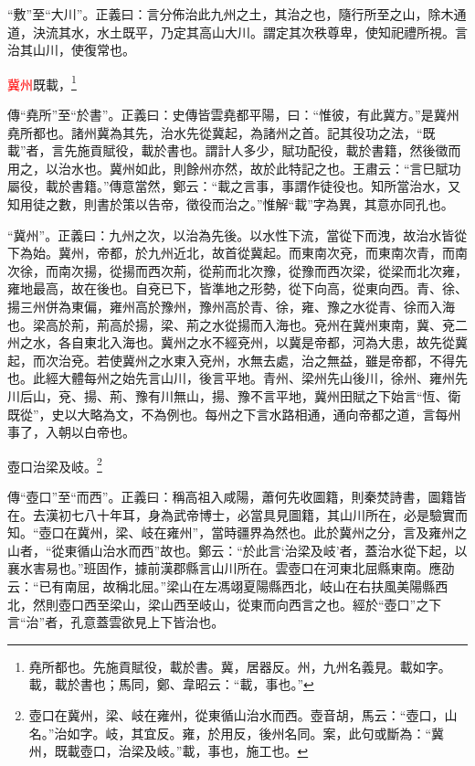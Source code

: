 {\noindent\shu{}\fzkt “敷”至“大川”。正義曰：言分佈治此九州之土，其治之也，隨行所至之山，除木通道，決流其水，水土既平，乃定其高山大川。謂定其次秩尊卑，使知祀禮所視。言治其山川，使復常也。 \par}

\textcolor{red}{冀州}既載，\footnote{堯所都也。先施貢賦役，載於書。冀，居器反。州，九州名義見。載如字。載，載於書也；馬同，鄭、韋昭云：“載，事也。”}

{\noindent\zhuan{}\fzbyks 傳“堯所”至“於書”。正義曰：史傳皆雲堯都平陽，曰：“惟彼，有此冀方。”是冀州堯所都也。諸州冀為其先，治水先從冀起，為諸州之首。記其役功之法，“既載”者，言先施貢賦役，載於書也。謂計人多少，賦功配役，載於書籍，然後徵而用之，以治水也。冀州如此，則餘州亦然，故於此特記之也。王肅云：“言巳賦功屬役，載於書籍。”傳意當然，鄭云：“載之言事，事謂作徒役也。知所當治水，又知用徒之數，則書於策以告帝，徵役而治之。”惟解“載”字為異，其意亦同孔也。 \par}

{\noindent\shu{}\fzkt “冀州”。正義曰：九州之次，以治為先後。以水性下流，當從下而洩，故治水皆從下為始。冀州，帝都，於九州近北，故首從冀起。而東南次兗，而東南次青，而南次徐，而南次揚，從揚而西次荊，從荊而北次豫，從豫而西次梁，從梁而北次雍，雍地最高，故在後也。自兗已下，皆準地之形勢，從下向高，從東向西。青、徐、揚三州併為東偏，雍州高於豫州，豫州高於青、徐，雍、豫之水從青、徐而入海也。梁高於荊，荊高於揚，梁、荊之水從揚而入海也。兗州在冀州東南，冀、兗二州之水，各自東北入海也。冀州之水不經兗州，以冀是帝都，河為大患，故先從冀起，而次治兗。若使冀州之水東入兗州，水無去處，治之無益，雖是帝都，不得先也。此經大體每州之始先言山川，後言平地。青州、梁州先山後川，徐州、雍州先川后山，兗、揚、荊、豫有川無山，揚、豫不言平地，冀州田賦之下始言“恆、衛既從”，史以大略為文，不為例也。每州之下言水路相通，通向帝都之道，言每州事了，入朝以白帝也。 \par}

壺口治梁及岐。\footnote{壺口在冀州，梁、岐在雍州，從東循山治水而西。壺音胡，馬云：“壺口，山名。”治如字。岐，其宜反。雍，於用反，後州名同。案，此句或斷為：“冀州，既載壺口，治梁及岐。”載，事也，施工也。}

{\noindent\zhuan{}\fzbyks 傳“壺口”至“而西”。正義曰：稱高祖入咸陽，蕭何先收圖籍，則秦焚詩書，圖籍皆在。去漢初七八十年耳，身為武帝博士，必當具見圖籍，其山川所在，必是驗實而知。“壺口在冀州，梁、岐在雍州”，當時疆界為然也。此於冀州之分，言及雍州之山者，“從東循山治水而西”故也。鄭云：“於此言‘治梁及岐’者，蓋治水從下起，以襄水害易也。”班固作，據前漢郡縣言山川所在。雲壺口在河東北屈縣東南。應劭云：“已有南屈，故稱北屈。”梁山在左馮翊夏陽縣西北，岐山在右扶風美陽縣西北，然則壺口西至梁山，梁山西至岐山，從東而向西言之也。經於“壺口”之下言“治”者，孔意蓋雲欲見上下皆治也。 \par}

